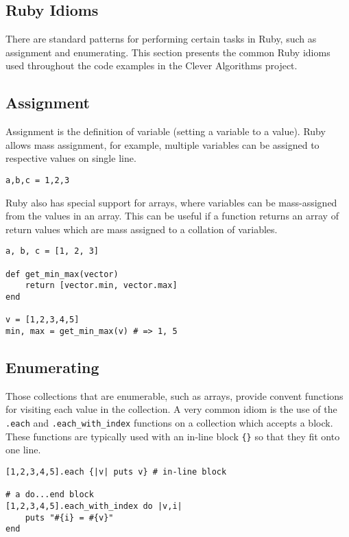 \begin{bibunit}
% 
% 
\section*{Ruby Idioms}
There are standard patterns for performing certain tasks in Ruby, such as assignment and enumerating. This section presents the common Ruby idioms used throughout the code examples in the Clever Algorithms project.

\subsection{Assignment}
Assignment is the definition of variable (setting a variable to a value). Ruby allows mass assignment, for example, multiple variables can be assigned to respective values on single line.

\begin{lstlisting}
a,b,c = 1,2,3
\end{lstlisting}

Ruby also has special support for arrays, where variables can be mass-assigned from the values in an array. This can be useful if a function returns an array of return values which are mass assigned to a collation of variables.

\begin{lstlisting}
a, b, c = [1, 2, 3]

def get_min_max(vector)
	return [vector.min, vector.max]
end

v = [1,2,3,4,5]
min, max = get_min_max(v) # => 1, 5
\end{lstlisting}

\subsection{Enumerating}
Those collections that are enumerable, such as arrays, provide convent functions for visiting each value in the collection. A very common idiom is the use of the \texttt{.each} and \texttt{.each\_with\_index} functions on a collection which accepts a block. These functions are typically used with an in-line block \texttt{\{\}} so that they fit onto one line.

\begin{lstlisting}
[1,2,3,4,5].each {|v| puts v} # in-line block

# a do...end block
[1,2,3,4,5].each_with_index do |v,i|
	puts "#{i} = #{v}"
end
\end{lstlisting}


\end{bibunit}
